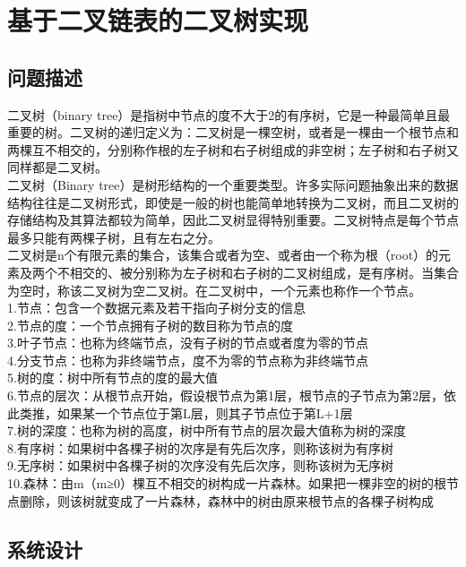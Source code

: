 \documentclass[supercite]{Experimental_Report}
\theoremstyle{definition}
\begin{document}
\begin{sloppypar}
\section{基于二叉链表的二叉树实现}

\subsection{问题描述}

二叉树（binary tree）是指树中节点的度不大于2的有序树，它是一种最简单且最重要的树。二叉树的递归定义为：二叉树是一棵空树，或者是一棵由一个根节点和两棵互不相交的，分别称作根的左子树和右子树组成的非空树；左子树和右子树又同样都是二叉树。\\
二叉树（Binary tree）是树形结构的一个重要类型。许多实际问题抽象出来的数据结构往往是二叉树形式，即使是一般的树也能简单地转换为二叉树，而且二叉树的存储结构及其算法都较为简单，因此二叉树显得特别重要。二叉树特点是每个节点最多只能有两棵子树，且有左右之分。\\
二叉树是n个有限元素的集合，该集合或者为空、或者由一个称为根（root）的元素及两个不相交的、被分别称为左子树和右子树的二叉树组成，是有序树。当集合为空时，称该二叉树为空二叉树。在二叉树中，一个元素也称作一个节点。\\
1.节点：包含一个数据元素及若干指向子树分支的信息\\
2.节点的度：一个节点拥有子树的数目称为节点的度\\
3.叶子节点：也称为终端节点，没有子树的节点或者度为零的节点\\
4.分支节点：也称为非终端节点，度不为零的节点称为非终端节点\\
5.树的度：树中所有节点的度的最大值\\
6.节点的层次：从根节点开始，假设根节点为第1层，根节点的子节点为第2层，依此类推，如果某一个节点位于第L层，则其子节点位于第L+1层\\
7.树的深度：也称为树的高度，树中所有节点的层次最大值称为树的深度\\
8.有序树：如果树中各棵子树的次序是有先后次序，则称该树为有序树\\
9.无序树：如果树中各棵子树的次序没有先后次序，则称该树为无序树\\
10.森林：由m（m≥0）棵互不相交的树构成一片森林。如果把一棵非空的树的根节点删除，则该树就变成了一片森林，森林中的树由原来根节点的各棵子树构成

\subsection{系统设计}


\end{sloppypar}
\end{document}
